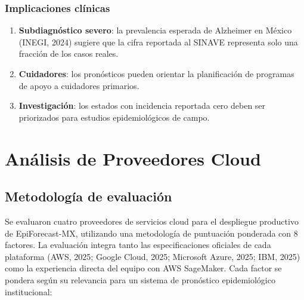 \documentclass[12pt, letterpaper]{article}
\begin{document}
\subsubsection{Implicaciones clínicas}

\begin{enumerate}[noitemsep]
    \item \textbf{Subdiagnóstico severo}: la prevalencia esperada de Alzheimer en México (INEGI, 2024) sugiere que la cifra reportada al SINAVE representa solo una fracción de los casos reales.
    \item \textbf{Cuidadores}: los pronósticos pueden orientar la planificación de programas de apoyo a cuidadores primarios.
    \item \textbf{Investigación}: los estados con incidencia reportada cero deben ser priorizados para estudios epidemiológicos de campo.
\end{enumerate}

\newpage
\section{Análisis de Proveedores Cloud}\label{sec:cloud}

\subsection{Metodología de evaluación}

Se evaluaron cuatro proveedores de servicios cloud para el despliegue productivo de EpiForecast-MX, utilizando una metodología de puntuación ponderada con 8 factores. La evaluación integra tanto las especificaciones oficiales de cada plataforma (AWS, 2025; Google Cloud, 2025; Microsoft Azure, 2025; IBM, 2025) como la experiencia directa del equipo con AWS SageMaker. Cada factor se pondera según su relevancia para un sistema de pronóstico epidemiológico institucional:
\end{document}
